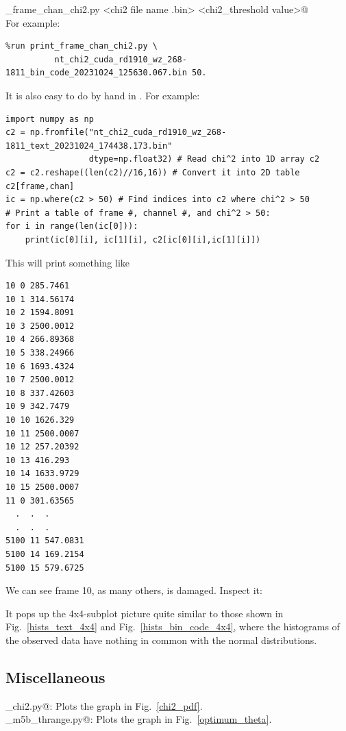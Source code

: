 \documentclass[letterpaper,twoside,12pt]{article}
\begin{document}
\noindent \verb@print_frame_chan_chi2.py <chi2 file name .bin> <chi2_threshold value>@ \\

\noindent For example:
\begin{verbatim}
%run print_frame_chan_chi2.py \
          nt_chi2_cuda_rd1910_wz_268-1811_bin_code_20231024_125630.067.bin 50.
\end{verbatim}

It is also easy to do by hand in \verb@IPython@. For example: 
\begin{verbatim}
import numpy as np
c2 = np.fromfile("nt_chi2_cuda_rd1910_wz_268-1811_text_20231024_174438.173.bin"
                 dtype=np.float32) # Read chi^2 into 1D array c2
c2 = c2.reshape((len(c2)//16,16)) # Convert it into 2D table c2[frame,chan]
ic = np.where(c2 > 50) # Find indices into c2 where chi^2 > 50
# Print a table of frame #, channel #, and chi^2 > 50:
for i in range(len(ic[0])):
    print(ic[0][i], ic[1][i], c2[ic[0][i],ic[1][i]])
\end{verbatim}

This will print something like
\begin{verbatim}
10 0 285.7461
10 1 314.56174
10 2 1594.8091
10 3 2500.0012
10 4 266.89368
10 5 338.24966
10 6 1693.4324
10 7 2500.0012
10 8 337.42603
10 9 342.7479
10 10 1626.329
10 11 2500.0007
10 12 257.20392
10 13 416.293
10 14 1633.9729
10 15 2500.0007
11 0 301.63565
  .  .  .  
  .  .  .  
5100 11 547.0831
5100 14 169.2154
5100 15 579.6725
\end{verbatim}

We can see frame 10, as many others, is damaged. Inspect it: \\

\noindent \verb@%run inspect_nt.py rd1910_wz_268-1811_text.m5b 056  10 1@ \\

It pops up the 4x4-subplot picture quite similar to those shown in Fig.~\ref{hists_text_4x4} and Fig.~\ref{hists_bin_code_4x4}, where the histograms of the observed data have nothing in common with the normal distributions. 


\subsection{Miscellaneous}

\verb@plot_chi2.py@: Plots the graph in Fig.~\ref{chi2_pdf}. \\
\verb@plot_m5b_thrange.py@: Plots the graph in Fig.~\ref{optimum_theta}. \\
\end{document}
